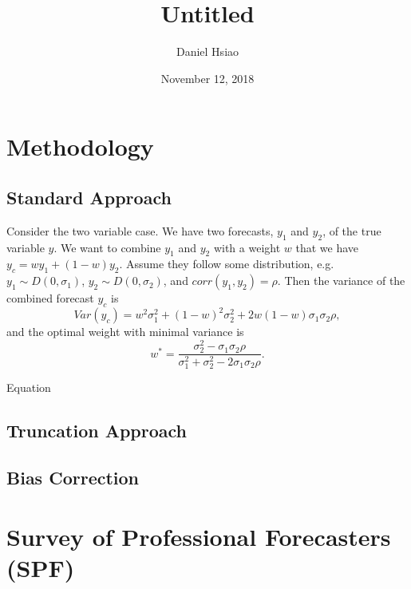 \documentclass[]{article}
\title{Untitled}
\author{Daniel Hsiao}
\date{November 12, 2018}
\begin{document}
\maketitle

{
\setcounter{tocdepth}{3}
\tableofcontents
}
\newpage

\hypertarget{methodology}{%
\section{Methodology}\label{methodology}}

\hypertarget{standard-approach}{%
\subsection{Standard Approach}\label{standard-approach}}

Consider the two variable case. We have two forecasts, \(y_1\) and
\(y_2\), of the true variable \(y\). We want to combine \(y_1\) and
\(y_2\) with a weight \(w\) that we have \(y_c = w y_1 + (1-w) y_2\).
Assume they follow some distribution, e.g. \(y_1 \sim D(0,\sigma_1)\),
\(y_2 \sim D(0,\sigma_2)\), and \(corr(y_1,y_2)=\rho\). Then the
variance of the combined forecast \(y_c\) is \begin{equation}
\label{eqn: var yc}
Var(y_c) = w^2\sigma_1^2+ (1-w)^2\sigma_2^2+2w(1-w)\sigma_1\sigma_2\rho,
\end{equation} and the optimal weight with minimal variance is
\begin{equation}
\label{eqn: simple weight}
w^*=\frac{\sigma_2^2-\sigma_1\sigma_2\rho}{\sigma_1^2+\sigma_2^2 -2\sigma_1\sigma_2\rho}.
\end{equation}

Equation

\hypertarget{truncation-approach}{%
\subsection{Truncation Approach}\label{truncation-approach}}

\hypertarget{bias-correction}{%
\subsection{Bias Correction}\label{bias-correction}}

\hypertarget{survey-of-professional-forecasters-spf}{%
\section{Survey of Professional Forecasters
(SPF)}\label{survey-of-professional-forecasters-spf}}
\end{document}
